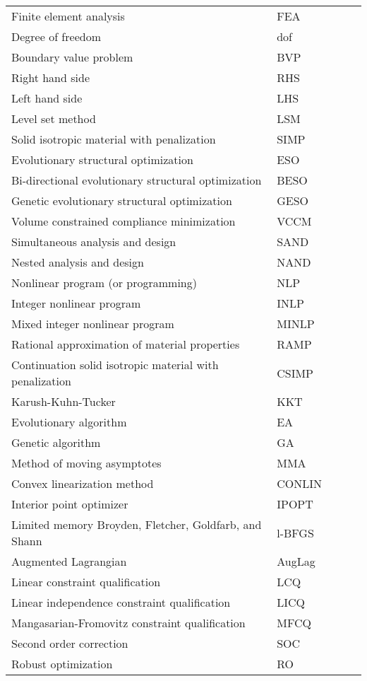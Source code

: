 {\begin{longtable}{lp{4cm}lp{3cm}l}
 		Finite element analysis	& FEA \\
 		Degree of freedom & dof \\
 		Boundary value problem & BVP \\
 		Right hand side & RHS \\
 		Left hand side & LHS \\
 		Level set method & LSM \\
 		Solid isotropic material with penalization & SIMP \\
 		Evolutionary structural optimization & ESO \\
 		Bi-directional evolutionary structural optimization & BESO \\
 		Genetic evolutionary structural optimization & GESO \\
 		Volume constrained compliance minimization & VCCM \\
 		Simultaneous analysis and design & SAND \\
 		Nested analysis and design & NAND \\
 		Nonlinear program (or programming) & NLP \\
 		Integer nonlinear program & INLP \\
 		Mixed integer nonlinear program & MINLP \\
 		Rational approximation of material properties & RAMP \\
 		Continuation solid isotropic material with penalization & CSIMP \\
 		Karush-Kuhn-Tucker & KKT \\
 		Evolutionary algorithm & EA \\
 		Genetic algorithm & GA \\
 		Method of moving asymptotes & MMA \\
 		Convex linearization method & CONLIN \\
	    Interior point optimizer & IPOPT \\
	    Limited memory Broyden, Fletcher, Goldfarb, and Shann & l-BFGS \\
	    Augmented Lagrangian & AugLag \\
	    Linear constraint qualification & LCQ \\
	    Linear independence constraint qualification & LICQ \\
	    Mangasarian-Fromovitz constraint qualification & MFCQ \\
	    Second order correction & SOC \\
	    Robust optimization & RO \\

\end{longtable}}
